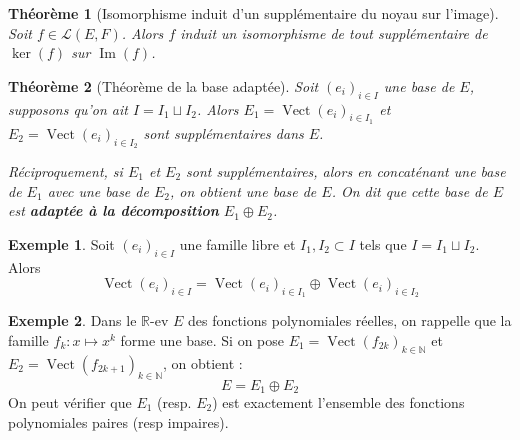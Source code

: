\documentclass[french]{book}
\newcommand{\N}{\mathbb{N}}
\newcommand{\R}{\mathbb{R}}
\theoremstyle{plain}
\newtheorem{thm}{Théorème}[chapter]
\theoremstyle{definition}
\newtheorem{exa}{Exemple}[chapter]
\theoremstyle{remark}
\DeclareMathOperator{\vect}{Vect}
\DeclareMathOperator{\im}{Im}
\begin{document}
\begin{thm}[Isomorphisme induit d'un supplémentaire du noyau sur l'image]
	Soit $f\in\mathcal{L}(E,F)$. Alors $f$ induit un isomorphisme de tout supplémentaire de $\ker(f)$ sur $\im(f)$.
\end{thm}
\begin{thm}[Théorème de la base adaptée]
	Soit $(e_i)_{i\in I}$ une base de $E$, supposons qu'on ait $I=I_1\sqcup I_2$. Alors $E_1=\vect(e_i)_{i\in I_1}$ et $E_2=\vect(e_i)_{i\in I_2}$ sont supplémentaires dans $E$. \par Réciproquement, si $E_1$ et $E_2$ sont supplémentaires, alors en concaténant une base de $E_1$ avec une base de $E_2$, on obtient une base de $E$. On dit que cette base de $E$ est \textbf{adaptée à la décomposition} $E_1\oplus E_2$.
\end{thm}
\begin{exa}
	Soit $(e_i)_{i\in I}$ une famille libre et $I_1,I_2\subset I$ tels que $I=I_1\sqcup I_2$. Alors $$\vect(e_i)_{i\in I}=\vect(e_i)_{i\in I_1}\oplus\vect(e_i)_{i\in I_2}$$
\end{exa}
\begin{exa}
	Dans le $\R$-ev $E$ des fonctions polynomiales réelles, on rappelle que la famille $f_k:x\mapsto x^k$ forme une base. Si on pose $E_1=\vect(f_{2k})_{k\in\N}$ et $E_2=\vect(f_{2k+1})_{k\in\N}$, on obtient : $$E=E_1\oplus E_2$$ On peut vérifier que $E_1$ (resp. $E_2$) est exactement l'ensemble des fonctions polynomiales paires (resp impaires).
\end{exa}
\end{document}
